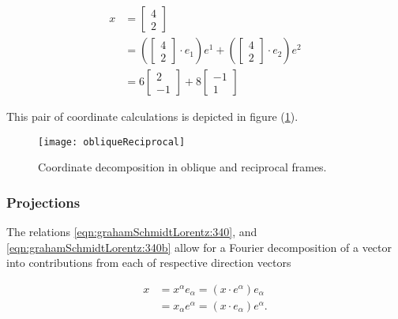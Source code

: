 \begin{equation}\label{eqn:grahamSchmidtLorentz:290}
\begin{aligned}
x
&=
\begin{bmatrix}
4 \\
2
\end{bmatrix} \\
&=
\left(
\begin{bmatrix}
4 \\
2
\end{bmatrix}
\cdot e_1
\right)
e^1
+
\left(
\begin{bmatrix}
4 \\
2
\end{bmatrix}
\cdot e_2
\right)
e^2 \\
&= 6
\begin{bmatrix}
2 \\
-1
\end{bmatrix}
+
8
\begin{bmatrix}
-1 \\
1
\end{bmatrix}
\end{aligned}
\end{equation}

This pair of coordinate calculations is depicted in figure (\ref{fig:obliqueReciprocal}).

\begin{figure}[htp]
\centering
\texttt{[image: obliqueReciprocal]}
\caption{Coordinate decomposition in oblique and reciprocal frames.}\label{fig:obliqueReciprocal}
\end{figure}

\subsubsection{Projections}

The relations \ref{eqn:grahamSchmidtLorentz:340}, and \ref{eqn:grahamSchmidtLorentz:340b} allow for a Fourier decomposition of a vector into contributions from each of respective direction vectors

\begin{equation}\label{eqn:grahamSchmidtLorentz:330}
\begin{aligned}
x &= x^\alpha e_\alpha = (x \cdot e^\alpha) e_\alpha \\
  &= x_\alpha e^\alpha = (x \cdot e_\alpha) e^\alpha.
\end{aligned}
\end{equation}


